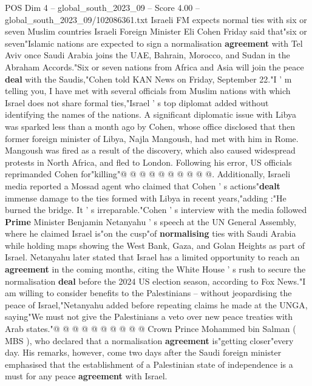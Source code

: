 \begin{textsample}{POS Dim 4 – global\_south\_2023\_09 – Score 4.00 – global\_south\_2023\_09/102086361.txt}  \label{ex:f4_pos_424}
Israeli FM expects normal ties with six or seven Muslim countries Israeli Foreign Minister Eli Cohen Friday said that"six or seven"Islamic nations are expected to sign a normalisation \textbf{agreement} with Tel Aviv once Saudi Arabia joins the UAE, Bahrain, Morocco, and Sudan in the Abraham Accords."Six or seven nations from Africa and Asia will join the peace \textbf{deal} with the Saudis,"Cohen told KAN News on Friday, September 22."I ' m telling you, I have met with several officials from Muslim nations with which Israel does not share formal ties,"Israel ' s top diplomat added without identifying the names of the nations.
A significant diplomatic issue with Libya was sparked less than a month ago by Cohen, whose office disclosed that then former foreign minister of Libya, Najla Mangoush, had met with him in Rome.
Mangoush was fired as a result of the discovery, which also caused widespread protests in North Africa, and fled to London.
Following his error, US officials reprimanded Cohen for"killing"@ @ @ @ @ @ @ @ @ @.
Additionally, Israeli media reported a Mossad agent who claimed that Cohen ' s actions"\textbf{dealt} immense damage to the ties formed with Libya in recent years,"adding :"He burned the bridge.
It ' s irreparable."Cohen ' s interview with the media followed \textbf{Prime} Minister Benjamin Netanyahu ' s speech at the UN General Assembly, where he claimed Israel is"on the cusp"of \textbf{normalising} ties with Saudi Arabia while holding maps showing the West Bank, Gaza, and Golan Heights as part of Israel.
Netanyahu later stated that Israel has a limited opportunity to reach an \textbf{agreement} in the coming months, citing the White House ' s rush to secure the normalisation \textbf{deal} before the 2024 US election season, according to Fox News."I am willing to consider benefits to the Palestinians -- without jeopardising the peace of Israel,"Netanyahu added before repeating claims he made at the UNGA, saying"We must not give the Palestinians a veto over new peace treaties with Arab states."@ @ @ @ @ @ @ @ @ @ Crown Prince Mohammed bin Salman ( MBS ), who declared that a normalisation \textbf{agreement} is"getting closer"every day.
His remarks, however, come two days after the Saudi foreign minister emphasised that the establishment of a Palestinian state of independence is a must for any peace \textbf{agreement} with Israel.

\end{textsample}
